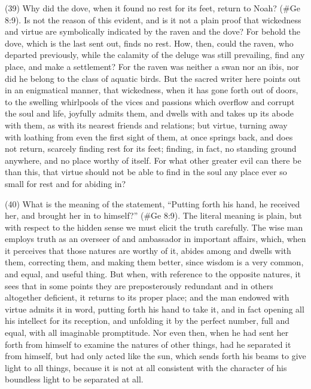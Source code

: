 (39) Why did the dove, when it found no rest for its feet, return to Noah? (\#Ge 8:9). Is not the
reason of this evident, and is it not a plain proof that wickedness and virtue are symbolically
indicated by the raven and the dove? For behold the dove, which is the last sent out, finds no rest.
How, then, could the raven, who departed previously, while the calamity of the deluge was still
prevailing, find any place, and make a settlement? For the raven was neither a swan nor an ibis,
nor did he belong to the class of aquatic birds. But the sacred writer here points out in an
enigmatical manner, that wickedness, when it has gone forth out of doors, to the swelling whirlpools
of the vices and passions which overflow and corrupt the soul and life, joyfully admits them, and
dwells with and takes up its abode with them, as with its nearest friends and relations; but virtue,
turning away with loathing from even the first sight of them, at once springs back, and does not
return, scarcely finding rest for its feet; finding, in fact, no standing ground anywhere, and no place
worthy of itself. For what other greater evil can there be than this, that virtue should not be able to
find in the soul any place ever so small for rest and for abiding in?

(40) What is the meaning of the statement, ``Putting forth his hand, he received her, and brought
her in to himself?'' (\#Ge 8:9). The literal meaning is plain, but with respect to the hidden sense
we must elicit the truth carefully. The wise man employs truth as an overseer of and ambassador in
important affairs, which, when it perceives that those natures are worthy of it, abides among and
dwells with them, correcting them, and making them better, since wisdom is a very common, and
equal, and useful thing. But when, with reference to the opposite natures, it sees that in some
points they are preposterously redundant and in others altogether deficient, it returns to its proper
place; and the man endowed with virtue admits it in word, putting forth his hand to take it, and in fact
opening all his intellect for its reception, and unfolding it by the perfect number, full and equal, with
all imaginable promptitude. Nor even then, when he had sent her forth from himself to examine the
natures of other things, had he separated it from himself, but had only acted like the sun, which
sends forth his beams to give light to all things, because it is not at all consistent with the character
of his boundless light to be separated at all.

